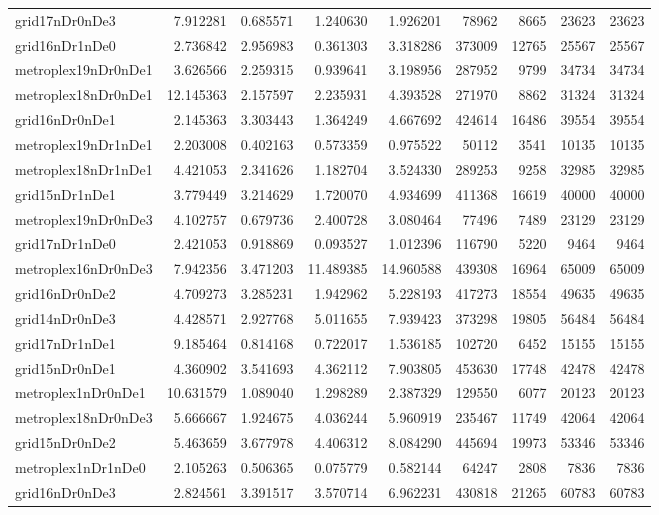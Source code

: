 \begin{longtable}{|l|r|r|r|r|r|r|r|r|}
grid17nDr0nDe3 & 7.912281 & 0.685571 & 1.240630 & 1.926201 & 78962 & 8665 & 23623 & 23623 \\
grid16nDr1nDe0 & 2.736842 & 2.956983 & 0.361303 & 3.318286 & 373009 & 12765 & 25567 & 25567 \\
metroplex19nDr0nDe1 & 3.626566 & 2.259315 & 0.939641 & 3.198956 & 287952 & 9799 & 34734 & 34734 \\
metroplex18nDr0nDe1 & 12.145363 & 2.157597 & 2.235931 & 4.393528 & 271970 & 8862 & 31324 & 31324 \\
grid16nDr0nDe1 & 2.145363 & 3.303443 & 1.364249 & 4.667692 & 424614 & 16486 & 39554 & 39554 \\
metroplex19nDr1nDe1 & 2.203008 & 0.402163 & 0.573359 & 0.975522 & 50112 & 3541 & 10135 & 10135 \\
metroplex18nDr1nDe1 & 4.421053 & 2.341626 & 1.182704 & 3.524330 & 289253 & 9258 & 32985 & 32985 \\
grid15nDr1nDe1 & 3.779449 & 3.214629 & 1.720070 & 4.934699 & 411368 & 16619 & 40000 & 40000 \\
metroplex19nDr0nDe3 & 4.102757 & 0.679736 & 2.400728 & 3.080464 & 77496 & 7489 & 23129 & 23129 \\
grid17nDr1nDe0 & 2.421053 & 0.918869 & 0.093527 & 1.012396 & 116790 & 5220 & 9464 & 9464 \\
metroplex16nDr0nDe3 & 7.942356 & 3.471203 & 11.489385 & 14.960588 & 439308 & 16964 & 65009 & 65009 \\
grid16nDr0nDe2 & 4.709273 & 3.285231 & 1.942962 & 5.228193 & 417273 & 18554 & 49635 & 49635 \\
grid14nDr0nDe3 & 4.428571 & 2.927768 & 5.011655 & 7.939423 & 373298 & 19805 & 56484 & 56484 \\
grid17nDr1nDe1 & 9.185464 & 0.814168 & 0.722017 & 1.536185 & 102720 & 6452 & 15155 & 15155 \\
grid15nDr0nDe1 & 4.360902 & 3.541693 & 4.362112 & 7.903805 & 453630 & 17748 & 42478 & 42478 \\
metroplex1nDr0nDe1 & 10.631579 & 1.089040 & 1.298289 & 2.387329 & 129550 & 6077 & 20123 & 20123 \\
metroplex18nDr0nDe3 & 5.666667 & 1.924675 & 4.036244 & 5.960919 & 235467 & 11749 & 42064 & 42064 \\
grid15nDr0nDe2 & 5.463659 & 3.677978 & 4.406312 & 8.084290 & 445694 & 19973 & 53346 & 53346 \\
metroplex1nDr1nDe0 & 2.105263 & 0.506365 & 0.075779 & 0.582144 & 64247 & 2808 & 7836 & 7836 \\
grid16nDr0nDe3 & 2.824561 & 3.391517 & 3.570714 & 6.962231 & 430818 & 21265 & 60783 & 60783 \\

\end{longtable}
